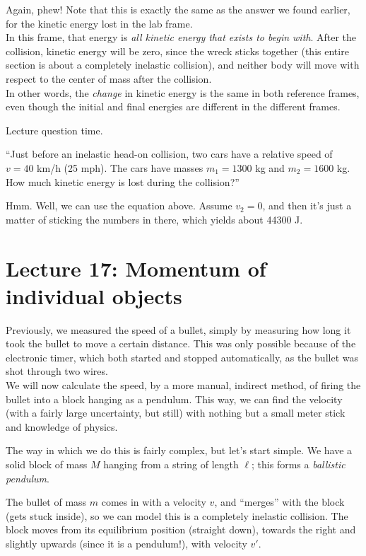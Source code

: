 \documentclass[12pt,a4paper]{report}
\begin{document}
Again, phew! Note that this is exactly the same as the answer we found earlier, for the kinetic energy lost in the lab frame.\\
In this frame, that energy is \emph{all kinetic energy that exists to begin with}. After the collision, kinetic energy will be zero, since the wreck sticks together (this entire section is about a completely inelastic collision), and neither body will move with respect to the center of mass after the collision.\\
In other words, the \emph{change} in kinetic energy is the same in both reference frames, even though the initial and final energies are different in the different frames.

Lecture question time.

``Just before an inelastic head-on collision, two cars have a relative speed of $v = 40$ km/h (25 mph). The cars have masses $m_1 = 1300$ kg and $m_2 = 1600$ kg.\\
How much kinetic energy is lost during the collision?''

Hmm. Well, we can use the equation above. Assume $v_2 = 0$, and then it's just a matter of sticking the numbers in there, which yields about 44300 J.

\section{Lecture 17: Momentum of individual objects}

Previously, we measured the speed of a bullet, simply by measuring how long it took the bullet to move a certain distance. This was only possible because of the electronic timer, which both started and stopped automatically, as the bullet was shot through two wires.\\
We will now calculate the speed, by a more manual, indirect method, of firing the bullet into a block hanging as a pendulum. This way, we can find the velocity (with a fairly large uncertainty, but still) with nothing but a small meter stick and knowledge of physics.

The way in which we do this is fairly complex, but let's start simple. We have a solid block of mass $M$ hanging from a string of length $\ell$; this forms a \emph{ballistic pendulum}.

The bullet of mass $m$ comes in with a velocity $v$, and ``merges'' with the block (gets stuck inside), so we can model this is a completely inelastic collision. The block moves from its equilibrium position (straight down), towards the right and slightly upwards (since it is a pendulum!), with velocity $v'$.
\end{document}

